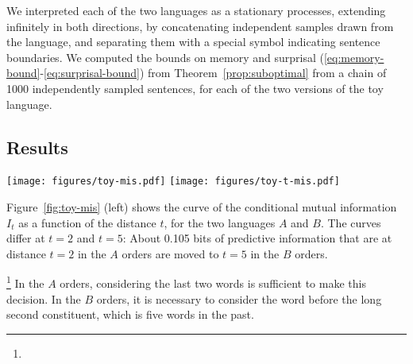 We interpreted each of the two languages as a stationary processes, extending infinitely in both directions, by concatenating independent samples drawn from the language, and separating them with a special symbol indicating sentence boundaries.
We computed the bounds on memory and surprisal (\ref{eq:memory-bound}-\ref{eq:surprisal-bound}) from Theorem~\ref{prop:suboptimal} from a chain of 1000 independently sampled sentences, for each of the two versions of the toy language.

\subsection{Results}	

\begin{figure*}
\centering
\texttt{[image: figures/toy-mis.pdf]}
\texttt{[image: figures/toy-t-mis.pdf]}
%
	\caption{Left: Decay of conditional mutual information $I_t$, as a function of the distance $t$, for the two versions in the artificial language. The areas under the two curves are identical, corresponding to the fact that both orders are equally predictable. However, mutual information decays faster in language $A$.\ \ \ Right: The minimal memory requirement $t I_t$ to store $I_t$ bits of information for timespan $t$, as a function of $t$. The area under the $B$ curve is larger, corresponding to larger memory demand for this order.}\label{fig:toy-mis}
\end{figure*}

Figure~\ref{fig:toy-mis} (left) shows the curve of the conditional mutual information $I_t$ as a function of the distance $t$, for the two languages $A$ and $B$. 
The curves differ at $t=2$ and $t=5$: 
About 0.105 bits of predictive information that are at distance $t=2$ in the $A$ orders are moved to $t=5$ in the $B$ orders.


\footnote{}
In the $A$ orders, considering the last two words is sufficient to make this decision.
In the $B$ orders, it is necessary to consider the word before the long second constituent, which is five words in the past.

